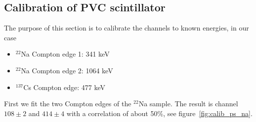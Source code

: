 \clearpage


\subsection{Calibration of PVC scintillator}
\label{sub:calibration}
The purpose of this section is to calibrate the channels to known energies, in our case
\begin{itemize}
\item $^{22}$Na Compton edge 1: 341 keV
\item $^{22}$Na Compton edge 2: 1064 keV
\item $^{137}$Cs Compton edge: 477 keV
\end{itemize}
First we fit the two Compton edges of the $^{22}$Na sample. The result is
channel $108 \pm 2$ and $414 \pm 4$ with a correlation of about 50\%, see
figure~\ref{fig:calib_ps_na}.

